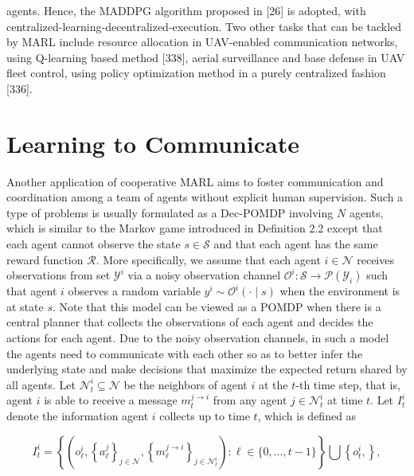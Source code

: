 \documentclass[10pt]{article}
\begin{document}
agents. Hence, the MADDPG algorithm proposed in [26] is adopted, with centralized-learning-decentralized-execution. Two other tasks that can be tackled by MARL include resource allocation in UAV-enabled communication networks, using Q-learning based method [338], aerial surveillance and base defense in UAV fleet control, using policy optimization method in a purely centralized fashion [336].

\section{Learning to Communicate}
Another application of cooperative MARL aims to foster communication and coordination among a team of agents without explicit human supervision. Such a type of problems is usually formulated as a Dec-POMDP involving $N$ agents, which is similar to the Markov game introduced in Definition 2.2 except that each agent cannot observe the state $s \in \mathcal{S}$ and that each agent has the same reward function $\mathcal{R}$. More specifically, we assume that each agent $i \in \mathcal{N}$ receives observations from set $\mathcal{Y}^{i}$ via a noisy observation channel $\mathcal{O}^{i}: \mathcal{S} \rightarrow \mathcal{P}\left(\mathcal{Y}_{i}\right)$ such that agent $i$ observes a random variable $y^{i} \sim \mathcal{O}^{i}(\cdot \mid s)$ when the environment is at state $s$. Note that this model can be viewed as a POMDP when there is a central planner that collects the observations of each agent and decides the actions for each agent. Due to the noisy observation channels, in such a model the agents need to communicate with each other so as to better infer the underlying state and make decisions that maximize the expected return shared by all agents. Let $\mathcal{N}_{t}^{i} \subseteq \mathcal{N}$ be the neighbors of agent $i$ at the $t$-th time step, that is, agent $i$ is able to receive a message $m_{t}^{j \rightarrow i}$ from any agent $j \in \mathcal{N}_{t}^{i}$ at time $t$. Let $I_{t}^{i}$ denote the information agent $i$ collects up to time $t$, which is defined as

\[
I_{t}^{i}=\left\{\left(o_{\ell}^{i},\left\{a_{\ell}^{j}\right\}_{j \in \mathcal{N}},\left\{m_{\ell}^{j \rightarrow i}\right\}_{j \in \mathcal{N}_{\ell}^{i}}\right): \ell \in\{0, \ldots, t-1\}\right\} \bigcup\left\{o_{t}^{i},\right\},
\]
\end{document}
